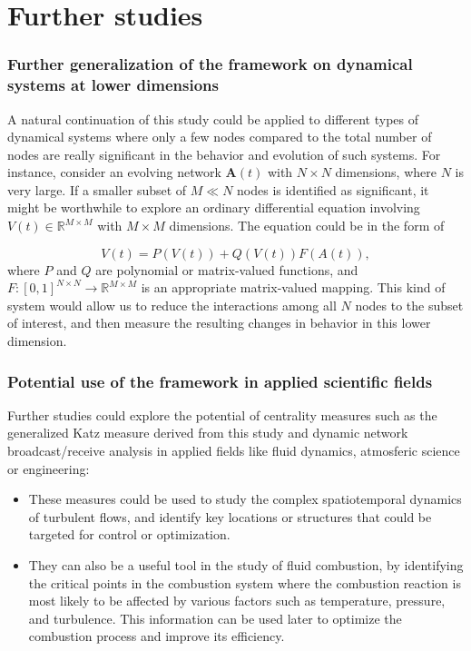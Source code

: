 
\chapter{Further studies}
\label{chap:further}
 
\subsection*{Further generalization of the framework on dynamical systems at lower dimensions}
A natural continuation of this study could be applied to different types of dynamical systems where only a few nodes compared to the total number of nodes are really significant in the behavior and evolution of such systems. For instance, consider an evolving network $\mathbf{A}(t)$ with $N \times N$ dimensions, where $N$ is very large. If a smaller subset of $M\ll N$ nodes is identified as significant, it might be worthwhile to explore an ordinary differential equation involving $V(t)\in \mathbb{R}^{M\times M}$ with $M\times M$ dimensions. The equation could be in the form of 

$$V(t)=P(V(t)) + Q(V(t))F(A(t)),$$ where $P$ and $Q$ are polynomial or matrix-valued functions, and $F: [0, 1]^{N×N} \to \mathbb{R}^{M\times M}$ is an appropriate matrix-valued mapping. This kind of system would allow us to reduce the interactions among all $N$ nodes to the subset of interest, and then measure the resulting changes in behavior in this lower dimension.

\subsection*{Potential use of the framework in applied scientific fields} 
Further studies could explore the potential of centrality measures such as the generalized Katz measure derived from this study and dynamic network broadcast/receive analysis in applied fields like fluid dynamics, atmosferic science or engineering: 

\begin{itemize}
  \item These measures could be used to study the complex spatiotemporal dynamics of turbulent flows, and identify key locations or structures that could be targeted for control or optimization. 
  \item They can also be a useful tool in the study of fluid combustion, by identifying the critical points in the combustion system where the combustion reaction is most likely to be affected by various factors such as temperature, pressure, and turbulence. This information can be used later to optimize the combustion process and improve its efficiency.
\end{itemize}
	
